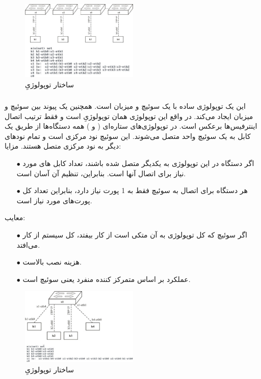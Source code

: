 \documentclass{article}
\begin{document}
\begin{figure}[H]
    \centering
    \includegraphics[width=0.5\textwidth]{figures/3b.jpg}
    \caption
	{
ساختار توپولوژیِ  
	}
    \label{fig:fig1}
\end{figure}
\subsubsection{}
این یک توپولوژی ساده با یک سوئیچ  و  میزبان است. همچنین یک پیوند بین سوئیچ و  میزبان ایجاد می‌کند. در واقع این توپولوژی همان توپولوژیِ  است و فقط ترتیب اتصال اینترفیس‌ها برعکس است. در توپولوژی‌های ستاره‌ای (  و ) همه دستگاه‌ها از طریق یک کابل به یک سوئیچ واحد متصل می‌شوند. این سوئیچ نود مرکزی است و تمام نودهای دیگر به نود مرکزی متصل هستند.
\newline
\newline
مزایا:

\begin{itemize}
\item [$\bullet$] اگر   دستگاه در این توپولوژی  به یکدیگر متصل شده باشند، تعداد کابل های مورد نیاز برای اتصال آنها   است. بنابراین، تنظیم آن آسان است.
\item [$\bullet$] هر دستگاه برای اتصال به سوئیچ فقط به 1 پورت نیاز دارد، بنابراین تعداد کل پورت‌های مورد نیاز  است.
\end{itemize}
معایب:
\begin{itemize}
\item [$\bullet$] اگر سوئیچ که کل توپولوژی به آن متکی است از کار بیفتد، کل سیستم از کار می‌افتد.
\item [$\bullet$] هزینه نصب بالاست.
\item [$\bullet$] عملکرد بر اساس متمرکز کننده منفرد یعنی سوئیچ است.

\end{itemize}


\begin{figure}[H]
    \centering
    \includegraphics[width=0.5\textwidth]{figures/3c.jpg}
    \caption
	{
ساختار توپولوژیِ  
	}
    \label{fig:fig1}
\end{figure}
\end{document}
